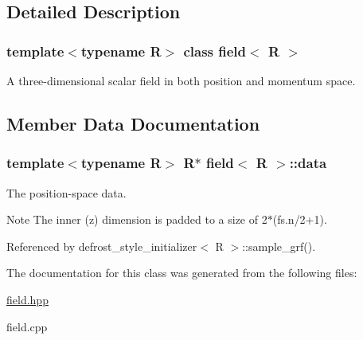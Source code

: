 \subsection{Detailed Description}
\subsubsection*{template$<$typename R$>$ class field$<$ R $>$}

A three-\/dimensional scalar field in both position and momentum space. 

\subsection{Member Data Documentation}
\hypertarget{classfield_a5c465fa5d00104c5bbb683a6574a4057}{
\subsubsection[{data}]{\setlength{\rightskip}{0pt plus 5cm}template$<$typename R$>$ R$\ast$ {\bf field}$<$ R $>$::{\bf data}}}
\label{classfield_a5c465fa5d00104c5bbb683a6574a4057}


The position-\/space data. \begin{DoxyNote}{Note}
The inner (z) dimension is padded to a size of 2$\ast$(fs.n/2+1). 
\end{DoxyNote}


Referenced by defrost\_\-style\_\-initializer$<$ R $>$::sample\_\-grf().

The documentation for this class was generated from the following files:\begin{DoxyCompactItemize}
\item 
\hyperlink{field_8hpp}{field.hpp}\item 
field.cpp\end{DoxyCompactItemize}
